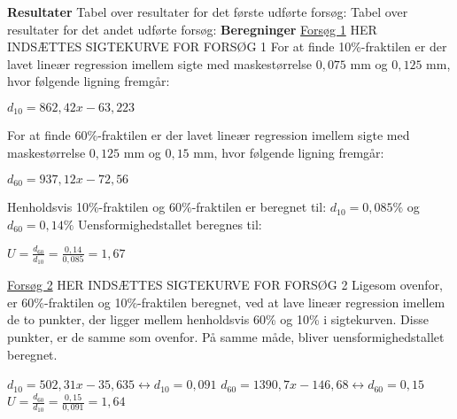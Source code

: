 \newline
\newline
\textbf{Resultater}
\newline
Tabel over resultater for det første udførte forsøg:
\newline
\newline
Tabel over resultater for det andet udførte forsøg:
\newline
\newline
\textbf{Beregninger}
\newline
\underline{Forsøg 1}
\newline
\newline
HER INDSÆTTES SIGTEKURVE FOR FORSØG 1
\newline
\newline
For at finde 10\%-fraktilen er der lavet lineær regression imellem sigte med maskestørrelse $0,\!075$ mm og $0,\!125$ mm, hvor følgende ligning fremgår: 

\begin{center}
	$d_{10}=862,\!42x - 63,\!223$
\end{center}

For at finde 60\%-fraktilen er der lavet lineær regression imellem sigte med maskestørrelse $0,\!125$ mm og $0,\!15$ mm, hvor følgende ligning fremgår:

\begin{center}
	$d_{60}=937,\!12x - 72,\!56$
\end{center}

Henholdsvis 10\%-fraktilen og 60\%-fraktilen er beregnet til: $d_{10}=0,\!085\%$ og $d_{60}=0,\!14\%$
\newline
\newline
Uensformighedstallet beregnes til:
\begin{center}
	$U = \frac{d_{60}}{d_{10}} = \frac{0,\!14}{0,\!085} = 1,\!67$
\end{center}

\underline{Forsøg 2}
\newline
\newline
HER INDSÆTTES SIGTEKURVE FOR FORSØG 2
\newline
\newline
Ligesom ovenfor, er 60\%-fraktilen og 10\%-fraktilen beregnet, ved at lave lineær regression imellem de to punkter, der ligger mellem henholdsvis 60\% og 10\% i sigtekurven. Disse punkter, er de samme som ovenfor. På samme måde, bliver uensformighedstallet beregnet. 

\begin{center}
	$d_{10}=502,\!31x - 35,\!635 \leftrightarrow d_{10}=0,\!091$
	\newline
	\newline
	$d_{60}=1390,\!7x - 146,\!68 \leftrightarrow d_{60}=0,\!15$
	\newline
	\newline 
	$U=\frac{d_{60}}{d_{10}} = \frac{0,\!15}{0,\!091} = 1,\!64$
\end{center}

